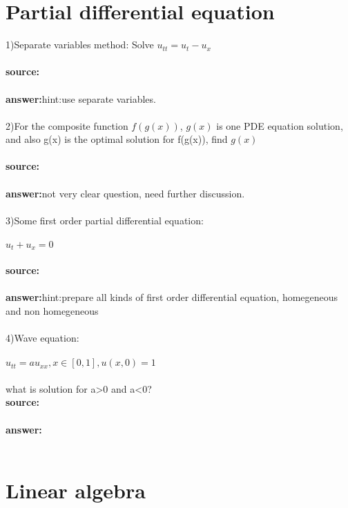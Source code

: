 \documentclass[11pt,fleqn]{book} %
\begin{document}
\section{Partial differential equation}
1)Separate variables method: Solve $u_{tt}=u_t-u_x$\\\\
\textbf{source:} \\\\
\textbf{answer:}hint:use separate variables.\\\\
2)For the composite function $f(g(x))$, $g(x)$ is one PDE equation solution, and also g(x) is the optimal solution for f(g(x)), find $g(x)$\\\\
\textbf{source:} \\\\
\textbf{answer:}not very clear question, need further discussion.\\\\
3)Some first order partial differential equation:\\\\
$u_t+u_x=0$ \\\\
\textbf{source:}\\\\
\textbf{answer:}hint:prepare all kinds of first order differential equation, homegeneous and non homegeneous\\\\
4)Wave equation: \\\\
$ u_{tt}=au_{xx}, x\in [0,1], u(x,0)=1$\\\\
what is solution for a>0 and a<0?\\
\textbf{source:}\\\\
\textbf{answer:} \\\\
\section{Linear algebra}
\end{document}
